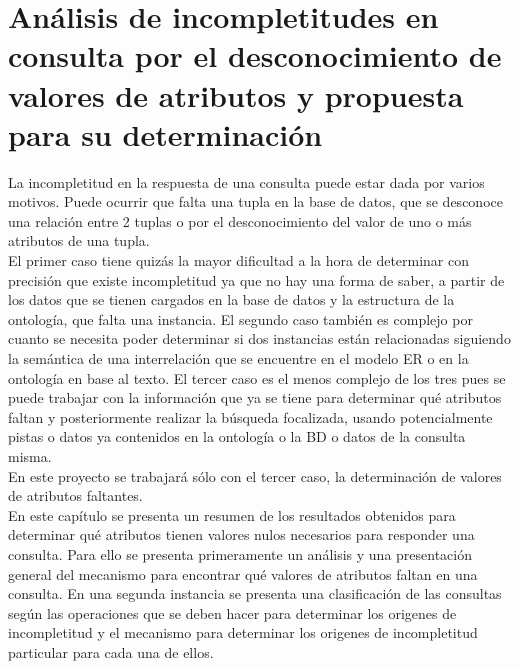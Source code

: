 \chapter{Análisis de incompletitudes en consulta por el desconocimiento de valores de atributos y propuesta para su determinación} \label{chap:analisisOrigenIncompletitud}

\newcommand{\RESULT}[3]{
	\text{#1} \\[5pt]
}
\newcommand{\QUERY}[1]{
	\begin{center}
	\emph{#1}
	\end{center}
}


La incompletitud en la respuesta de una consulta puede estar dada por varios motivos. Puede ocurrir que falta una tupla en la base de datos, que se desconoce una relación entre 2 tuplas o por el desconocimiento del valor de uno o más atributos de una tupla. \\

El primer caso tiene quizás la mayor dificultad a la hora de determinar con precisión que existe incompletitud ya que no hay una forma de saber, a partir de los datos que se tienen cargados en la base de datos y la estructura de la ontología, que falta una instancia. El segundo caso también es complejo por cuanto se necesita poder determinar si dos instancias están relacionadas siguiendo la semántica de una interrelación que se encuentre en el modelo ER o en la ontología en base al texto. El tercer caso es el menos complejo de los tres pues se puede trabajar con la información que ya se tiene para determinar qué atributos faltan y posteriormente realizar la búsqueda focalizada, usando potencialmente pistas o datos ya contenidos en la ontología o la BD o datos de la consulta misma.\\

En este proyecto se trabajará sólo con el tercer caso, la determinación de valores de atributos faltantes.\\

En este capítulo se presenta un resumen de los resultados obtenidos para determinar qué atributos tienen valores nulos necesarios para responder una consulta. Para ello se presenta primeramente un análisis y una presentación general del mecanismo para encontrar qué valores de atributos faltan en una consulta. En una segunda instancia se presenta una clasificación de las consultas según las operaciones que se deben hacer para determinar los origenes de incompletitud y el mecanismo para determinar los origenes de incompletitud particular para cada una de ellos.\\

